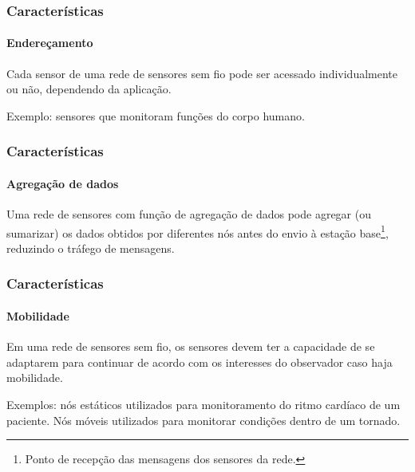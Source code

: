 \documentclass[notes]{beamer}
\begin{document}
\begin{frame}
\frametitle{Características}
\framesubtitle{Endereçamento}

\begin{block}

Cada sensor de uma rede de sensores sem fio pode ser acessado individualmente ou não, dependendo da aplicação. 

\end{block} \pause

\begin{exampleblock}

Exemplo: sensores que monitoram funções do corpo humano.

\end{exampleblock}


\end{frame}

\begin{frame}
\frametitle{Características}
\framesubtitle{Agregação de dados}

\begin{block}

Uma rede de sensores com função de agregação de dados pode agregar (ou sumarizar) os dados obtidos por diferentes nós antes do envio à estação base\footnote{Ponto de recepção das mensagens dos sensores da rede.}, reduzindo o tráfego de mensagens.

\end{block}

\end{frame}

\begin{frame}
\frametitle{Características}
\framesubtitle{Mobilidade}

\begin{block}

Em uma rede de sensores sem fio, os sensores devem ter a capacidade de se adaptarem para continuar de acordo com os interesses do observador caso haja mobilidade.
\end{block} \pause

\begin{exampleblock}

Exemplos: nós estáticos utilizados para monitoramento do ritmo cardíaco de um paciente.
Nós móveis utilizados para monitorar condições dentro de um tornado\cite{Twister}.

\end{exampleblock}

\end{frame}
\end{document}
